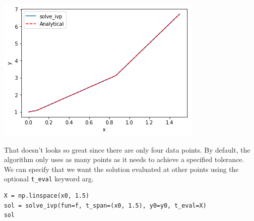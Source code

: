 \documentclass[11pt]{article}
\begin{document}
\begin{center}
\includegraphics[width=.9\linewidth]{obipy-resources/744bcb3e58866fd0750c7a1efd9d42e8-68311eMi.png}
\end{center}

That doesn't looks so great since there are only four data points. By default, the algorithm only uses as many points as it needs to achieve a specified tolerance. We can specify that we want the solution evaluated at other points using the optional \texttt{t\_eval} keyword arg.

\begin{verbatim}
X = np.linspace(x0, 1.5)
sol = solve_ivp(fun=f, t_span=(x0, 1.5), y0=y0, t_eval=X)
sol
\end{verbatim}
\end{document}
